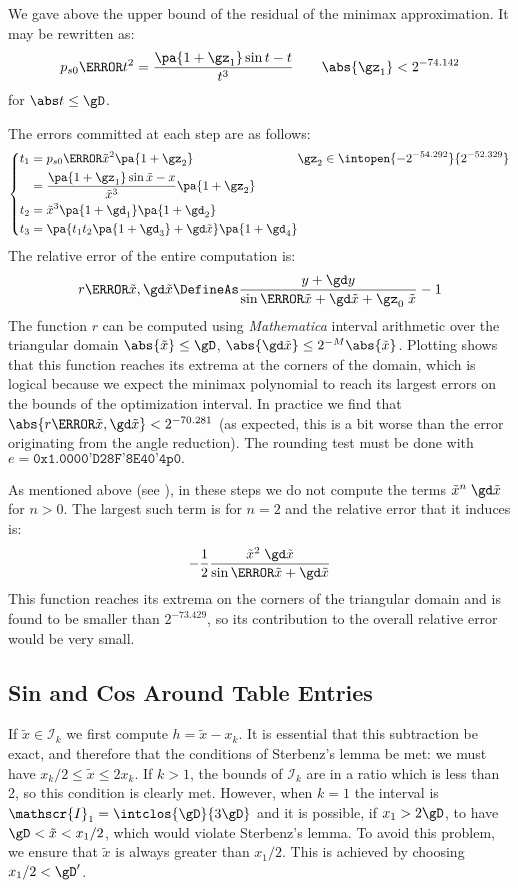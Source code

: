 \documentclass[10pt, a4paper, twoside]{basestyle}
\newcommand{\red}[1]{\tilde{#1}}
\begin{document}
We gave above the upper bound of the residual of the minimax approximation.  It may be rewritten as:
\[
p_{s0}\of{t^2} = \frac{\pa{1 + \gz_1} \sin t - t}{t^3} \qquad \abs{\gz_1} < 2^{-74.142}
\]
for $\abs t \le \gD$.

The errors committed at each step are as follows:
\[
\left\{
\begin{alignedat}{3}
t_1 &= p_{s0}\of{{\red x}^2} \pa{1 + \gz_2} &\gz_2 &\in \intopen{-2^{-54.292}}{2^{-52.329}} \\
&= \frac{\pa{1 + \gz_1} \sin {\red x} - x}{{\red x^3}} \pa{1 + \gz_2} \\
t_2 &= {\red x}^3 \pa{1 + \gd_1} \pa{1 + \gd_2} \\
t_3 &= \pa{t_1 t_2 \pa{1 + \gd_3} + \gd \red x} \pa{1 + \gd_4}
\end{alignedat}
\right.
\]
The relative error of the entire computation is:
\[
r\of{\red x, \gd \red x} \DefineAs \frac{y + \gd y}{\sin\of{\red x + \gd \red x + \gz_0 \; \red x}} - 1
\]
The function $r$ can be computed using \textit{Mathematica} interval arithmetic over the triangular domain $\abs{\red x} \le \gD$, $\abs{\gd \red x} \le 2^{-M} \abs{\red x}$.  Plotting shows that this function reaches its extrema at the corners of the domain, which is logical because we expect the minimax polynomial to reach its largest errors on the bounds of the optimization interval.  In practice we find that $\abs{r\of{\red x, \gd \red x}} < 2^{-70.281}$ (as expected, this is a bit worse than the error originating from the angle reduction).  The rounding test must be done with $e = \texttt{0x1.0000'D28F'8E40'4p0}.$

As mentioned above (see ), in these steps we do not compute the terms ${\red x}^n \; \gd \red x$ for $n > 0$.  The largest such term is for $n = 2$ and the relative error that it induces is:
\[
-\frac{1}{2} \frac{{\red x}^2 \; \gd \red x}{\sin\of{\red x + \gd \red x}}
\]
This function reaches its extrema on the corners of the triangular domain and is found to be smaller than $2^{-73.429}$, so its contribution to the overall relative error would be very small.

\subsection*{Sin and Cos Around Table Entries}\label{interval1}

If $\red x \in \mathscr{I}_k$ we first compute $h = \red x - x_k$.  It is essential that this subtraction be exact, and therefore that the conditions of Sterbenz's lemma be met: we must have $x_k / 2 \le \red x \le 2 x_k$.  If $k > 1$, the bounds of $\mathscr{I}_k$ are in a ratio which is less than 2, so this condition is clearly met.  However, when $k = 1$ the interval is $\mathscr{I}_1 = \intclos{\gD}{3 \gD}$ and it is possible, if $x_1 > 2 \gD$, to have  $\gD < \red x < x_1 /2$, which would violate Sterbenz's lemma.  To avoid this problem, we ensure that $\red x$ is always greater than $x_1 /2$.  This is achieved by choosing $x_1 / 2 < \gD'$.
\end{document}
